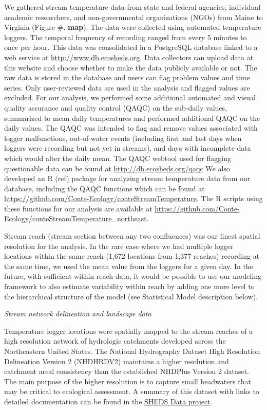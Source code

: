\documentclass[]{article}
\begin{document}
We gathered stream temperature data from state and federal agencies,
individual academic researchers, and non-governmental organizations
(NGOs) from Maine to Virginia (Figure \#. \textbf{map}). The data were
collected using automated temperature loggers. The temporal frequency of
recording ranged from every 5 minutes to once per hour. This data was
consolidated in a PostgreSQL database linked to a web service at
\url{http://www.db.ecosheds.org}. Data collectors can upload data at
this website and choose whether to make the data publicly available or
not. The raw data is stored in the database and users can flag problem
values and time series. Only user-reviewed data are used in the analysis
and flagged values are excluded. For our analysis, we performed some
additional automated and visual quality assurance and quality control
(QAQC) on the sub-daily values, summarized to mean daily temperatures
and performed additional QAQC on the daily values. The QAQC was intended
to flag and remove values associated with logger malfunctions,
out-of-water events (including first and last days when loggers were
recording but not yet in streams), and days with incomplete data which
would alter the daily mean. The QAQC webtool used for flagging
questionable data can be found at \url{http://db.ecosheds.org/qaqc} We
also developed an R (ref) package for analyzing stream temperature data
from our database, including the QAQC functions which can be found at
\url{https://github.com/Conte-Ecology/conteStreamTemperature}. The R
scripts using these functions for our analysis are available at
\url{https://github.com/Conte-Ecology/conteStreamTemperature_northeast}.

Stream reach (stream section between any two confluences) was our finest
spatial resolution for the analysis. In the rare case where we had
multiple logger locations within the same reach (1,672 locations from
1,377 reaches) recording at the same time, we used the mean value from
the loggers for a given day. In the future, with sufficient within reach
data, it would be possible to use our modeling framework to also
estimate variability within reach by adding one more level to the
hierarchical structure of the model (see Statistical Model description
below).

\emph{Stream network delineation and landscape data}

Temperature logger locations were spatially mapped to the stream reaches
of a high resolution network of hydrologic catchments developed across
the Northeastern United States. The National Hydrography Dataset High
Resolution Delineation Version 2 (NHDHRDV2) maintains a higher
resolution and catchment areal consistency than the established NHDPlus
Version 2 dataset. The main purpose of the higher resolution is to
capture small headwaters that may be critical to ecological assessment.
A summary of this dataset with links to detailed documentation can be
found in the \href{http://conte-ecology.github.io/shedsGISData/}{SHEDS
Data project}.
\end{document}
